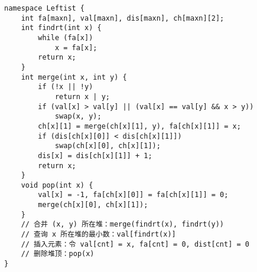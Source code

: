 \begin{verbatim}
namespace Leftist {
    int fa[maxn], val[maxn], dis[maxn], ch[maxn][2];
    int findrt(int x) {
        while (fa[x])
            x = fa[x];
        return x;
    }
    int merge(int x, int y) {
        if (!x || !y)
            return x | y;
        if (val[x] > val[y] || (val[x] == val[y] && x > y))
            swap(x, y);
        ch[x][1] = merge(ch[x][1], y), fa[ch[x][1]] = x;
        if (dis[ch[x][0]] < dis[ch[x][1]])
            swap(ch[x][0], ch[x][1]);
        dis[x] = dis[ch[x][1]] + 1;
        return x;
    }
    void pop(int x) {
        val[x] = -1, fa[ch[x][0]] = fa[ch[x][1]] = 0;
        merge(ch[x][0], ch[x][1]);
    }
    // 合并 (x, y) 所在堆：merge(findrt(x), findrt(y))
    // 查询 x 所在堆的最小数：val[findrt(x)]
    // 插入元素：令 val[cnt] = x, fa[cnt] = 0, dist[cnt] = 0
    // 删除堆顶：pop(x)
}
\end{verbatim}
\clearpage
